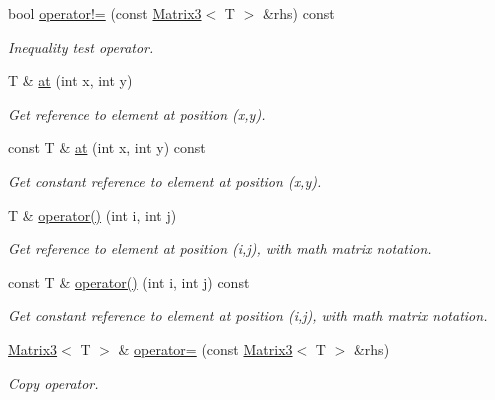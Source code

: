 \begin{DoxyCompactItemize}
bool \hyperlink{class_matrix3_a1ecdce469f979786b1fa257a6fca3866}{operator!=} (const \hyperlink{class_matrix3}{Matrix3}$<$ T $>$ \&rhs) const 
\begin{DoxyCompactList}\small\item\em Inequality test operator. \item\end{DoxyCompactList}\item 
T \& \hyperlink{class_matrix3_aba232062fee5e35419c2c0c73aa9b88d}{at} (int x, int y)
\begin{DoxyCompactList}\small\item\em Get reference to element at position (x,y). \item\end{DoxyCompactList}\item 
const T \& \hyperlink{class_matrix3_abd32ca6519bd0131709cdeca665b4a23}{at} (int x, int y) const 
\begin{DoxyCompactList}\small\item\em Get constant reference to element at position (x,y). \item\end{DoxyCompactList}\item 
T \& \hyperlink{class_matrix3_a21a0e224becfb4fa4447d4c656ad3d0c}{operator()} (int i, int j)
\begin{DoxyCompactList}\small\item\em Get reference to element at position (i,j), with math matrix notation. \item\end{DoxyCompactList}\item 
const T \& \hyperlink{class_matrix3_a345b3ea5baef035e1272506540c2905c}{operator()} (int i, int j) const 
\begin{DoxyCompactList}\small\item\em Get constant reference to element at position (i,j), with math matrix notation. \item\end{DoxyCompactList}\item 
\hyperlink{class_matrix3}{Matrix3}$<$ T $>$ \& \hyperlink{class_matrix3_afcd3742e1bb4ce693fd28c751a4d8e9c}{operator=} (const \hyperlink{class_matrix3}{Matrix3}$<$ T $>$ \&rhs)
\begin{DoxyCompactList}\small\item\em Copy operator. \item\end{DoxyCompactList}\item 

\end{DoxyCompactItemize}
